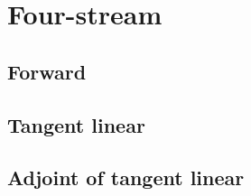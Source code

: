 %
\section{Four-stream}
\label{sec:four_stream}


\subsection{Forward}
\label{sec:four_stream-forward}


%
\subsection{Tangent linear}
\label{sec:four_stream-tangent_linear}


%
\subsection{Adjoint of tangent linear}
\label{sec:four_stream-adjoint_of_tangent_linear}
